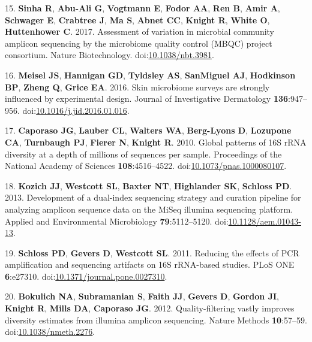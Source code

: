 \documentclass[11pt,]{article}
\begin{document}
\leavevmode\hypertarget{ref-Sinha2017}{}%
15. \textbf{Sinha R}, \textbf{Abu-Ali G}, \textbf{Vogtmann E},
\textbf{Fodor AA}, \textbf{Ren B}, \textbf{Amir A}, \textbf{Schwager E},
\textbf{Crabtree J}, \textbf{Ma S}, \textbf{Abnet CC}, \textbf{Knight
R}, \textbf{White O}, \textbf{Huttenhower C}. 2017. Assessment of
variation in microbial community amplicon sequencing by the microbiome
quality control (MBQC) project consortium. Nature Biotechnology.
doi:\href{https://doi.org/10.1038/nbt.3981}{10.1038/nbt.3981}.

\leavevmode\hypertarget{ref-Meisel2016}{}%
16. \textbf{Meisel JS}, \textbf{Hannigan GD}, \textbf{Tyldsley AS},
\textbf{SanMiguel AJ}, \textbf{Hodkinson BP}, \textbf{Zheng Q},
\textbf{Grice EA}. 2016. Skin microbiome surveys are strongly influenced
by experimental design. Journal of Investigative Dermatology
\textbf{136}:947--956.
doi:\href{https://doi.org/10.1016/j.jid.2016.01.016}{10.1016/j.jid.2016.01.016}.

\leavevmode\hypertarget{ref-Caporaso2010}{}%
17. \textbf{Caporaso JG}, \textbf{Lauber CL}, \textbf{Walters WA},
\textbf{Berg-Lyons D}, \textbf{Lozupone CA}, \textbf{Turnbaugh PJ},
\textbf{Fierer N}, \textbf{Knight R}. 2010. Global patterns of 16S rRNA
diversity at a depth of millions of sequences per sample. Proceedings of
the National Academy of Sciences \textbf{108}:4516--4522.
doi:\href{https://doi.org/10.1073/pnas.1000080107}{10.1073/pnas.1000080107}.

\leavevmode\hypertarget{ref-Kozich2013}{}%
18. \textbf{Kozich JJ}, \textbf{Westcott SL}, \textbf{Baxter NT},
\textbf{Highlander SK}, \textbf{Schloss PD}. 2013. Development of a
dual-index sequencing strategy and curation pipeline for analyzing
amplicon sequence data on the MiSeq illumina sequencing platform.
Applied and Environmental Microbiology \textbf{79}:5112--5120.
doi:\href{https://doi.org/10.1128/aem.01043-13}{10.1128/aem.01043-13}.

\leavevmode\hypertarget{ref-Schloss2011}{}%
19. \textbf{Schloss PD}, \textbf{Gevers D}, \textbf{Westcott SL}. 2011.
Reducing the effects of PCR amplification and sequencing artifacts on
16S rRNA-based studies. PLoS ONE \textbf{6}:e27310.
doi:\href{https://doi.org/10.1371/journal.pone.0027310}{10.1371/journal.pone.0027310}.

\leavevmode\hypertarget{ref-Bokulich2012}{}%
20. \textbf{Bokulich NA}, \textbf{Subramanian S}, \textbf{Faith JJ},
\textbf{Gevers D}, \textbf{Gordon JI}, \textbf{Knight R}, \textbf{Mills
DA}, \textbf{Caporaso JG}. 2012. Quality-filtering vastly improves
diversity estimates from illumina amplicon sequencing. Nature Methods
\textbf{10}:57--59.
doi:\href{https://doi.org/10.1038/nmeth.2276}{10.1038/nmeth.2276}.
\end{document}
